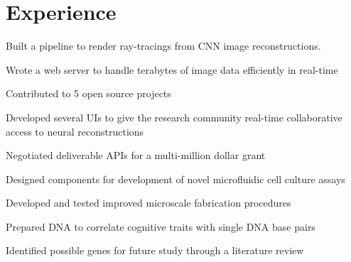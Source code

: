 \documentclass[]{deedy-resume-openfont}
\begin{document}
\begin{minipage}[t]{0.66\textwidth} 


\section{Experience}

\vspace{\topsep}
\begin{tightemize}
\item Built a pipeline to render ray-tracings from CNN image reconstructions.
\item Wrote a web server to handle terabytes of image data efficiently in real-time
\item Contributed to 5 open source projects
\item Developed several UIs to give the research community real-time collaborative access to neural reconstructions
\item Negotiated deliverable APIs for a multi-million dollar grant
\end{tightemize}
\sectionsep

\begin{tightemize}
\item Designed components for development of novel microfluidic cell culture assays
\item Developed and tested improved microscale fabrication procedures
\end{tightemize}
\sectionsep

\begin{tightemize}
\item Prepared DNA to correlate cognitive traits with single DNA base pairs
\item Identified possible genes for future study through a literature review
\end{tightemize}
\sectionsep



\end{minipage}
\end{document}
